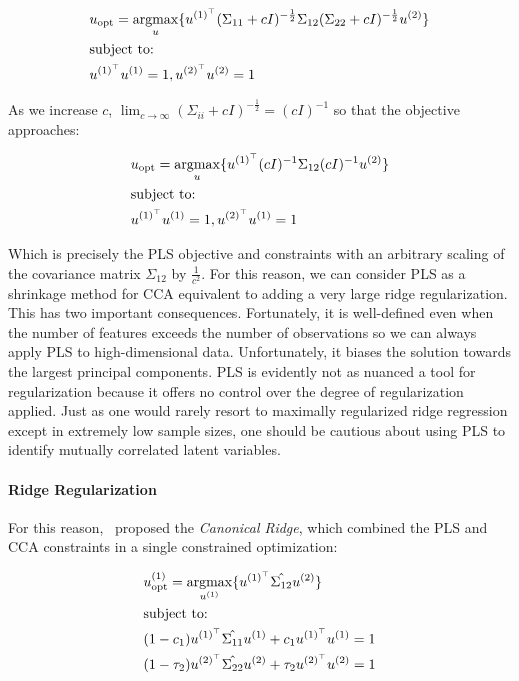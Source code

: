 \begin{align}\label{eq:cca}
     & u_{\text{opt}}=\underset{u}{\mathrm{argmax}}\{ u^{(1)^{\top}}(\Sigma_{11}+ c I)^{-\frac{1}{2}}\Sigma_{12}(\Sigma_{22}+c I)^{-\frac{1}{2}}u^{(2)} \} \\
     & \text{subject to:} \notag \\
     & u^{(1)^{\top}}u^{(1)}=1, u^{(2)^{\top}}u^{(2)}=1 \notag
\end{align}

As we increase $c$, $\lim_{c \to \infty} (\Sigma_{ii}+ c I)^{-\frac{1}{2}}= (c I)^{-1}$ so that the objective approaches:

\begin{align}
     & u_{\text{opt}}=\underset{u}{\mathrm{argmax}}\{ u^{(1)^{\top}}(c I)^{-1}\Sigma_{12}(c I)^{-1}u^{(2)} \} \\
        & \text{subject to:} \notag \\
        & u^{(1)^{\top}}u^{(1)}=1, u^{(2)^{\top}}u^{(1)}=1 \notag
\end{align}

Which is precisely the PLS objective and constraints with an arbitrary scaling of the covariance matrix $\Sigma_{12}$ by $\frac{1}{c^2}$.
For this reason, we can consider PLS as a shrinkage method for CCA equivalent to adding a very large ridge regularization.
This has two important consequences.
Fortunately, it is well-defined even when the number of features exceeds the number of observations so we can always apply PLS to high-dimensional data.
Unfortunately, it biases the solution towards the largest principal components.
PLS is evidently not as nuanced a tool for regularization because it offers no control over the degree of regularization applied.
Just as one would rarely resort to maximally regularized ridge regression except in extremely low sample sizes, one should be cautious about using PLS to identify mutually correlated latent variables.

\paragraph{Ridge Regularization}

For this reason,~\cite{vinod1976canonical} proposed the \textit{Canonical Ridge}, which combined the PLS and CCA constraints in a single constrained optimization:

\begin{align}
     & u^{(1)}_{\text{opt}} = \underset{u^{(1)}}{\mathrm{argmax}} \{ u^{(1)^{\top}} \hat{\Sigma_{12}} u^{(2)} \} \\
     & \text{subject to:} \notag \\
     & (1 - c_1) u^{(1)^{\top}} \hat{\Sigma_{11}} u^{(1)} + c_1 u^{(1)^{\top}} u^{(1)} = 1 \notag \\
     & (1 - \tau_2) u^{(2)^{\top}} \hat{\Sigma_{22}} u^{(2)} + \tau_2 u^{(2)^{\top}} u^{(2)} = 1 \notag
\end{align}

